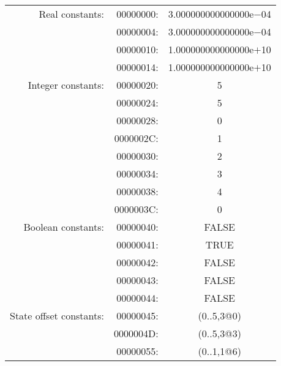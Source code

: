 \begin{center}\begin{tabular}{|r|r|c|}
\hline
Real constants: & 00000000: & 3.000000000000000e$-$04 \\
                & 00000004: & 3.000000000000000e$-$04 \\
                & 00000010: & 1.000000000000000e$+$10 \\
                & 00000014: & 1.000000000000000e$+$10 \\
\hline
Integer constants: & 00000020: &  5 \\
                   & 00000024: &  5 \\
                   & 00000028: &  0 \\
                   & 0000002C: &  1 \\
                   & 00000030: &  2 \\
                   & 00000034: &  3 \\
                   & 00000038: &  4 \\
                   & 0000003C: &  0 \\
\hline
Boolean constants: & 00000040: & FALSE \\
                   & 00000041: & TRUE \\
                   & 00000042: & FALSE \\
                   & 00000043: & FALSE \\
                   & 00000044: & FALSE \\
\hline
State offset constants: & 00000045: & (0..5,3@0) \\
                        & 0000004D: & (0..5,3@3) \\
                        & 00000055: & (0..1,1@6) \\
\hline
\end{tabular}\end{center}
